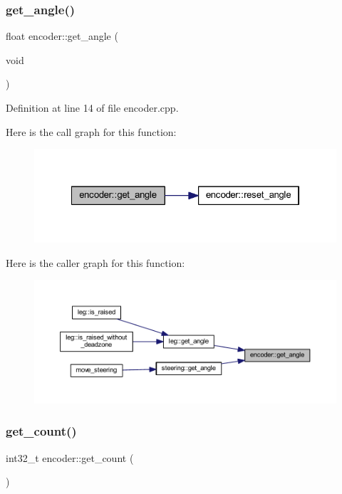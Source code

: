 \subsubsection{\texorpdfstring{get\_angle()}{get\_angle()}}
{\footnotesize\ttfamily float encoder\+::get\+\_\+angle (\begin{DoxyParamCaption}\item[{void}]{ }\end{DoxyParamCaption})}



Definition at line 14 of file encoder.\+cpp.

Here is the call graph for this function\+:
\nopagebreak
\begin{figure}[H]
\begin{center}
\leavevmode
\includegraphics[width=322pt]{classencoder_aba5b6ccdb374d7fcc5d9f2abab1a59da_cgraph}
\end{center}
\end{figure}
Here is the caller graph for this function\+:
\nopagebreak
\begin{figure}[H]
\begin{center}
\leavevmode
\includegraphics[width=350pt]{classencoder_aba5b6ccdb374d7fcc5d9f2abab1a59da_icgraph}
\end{center}
\end{figure}
\mbox{\label{classencoder_a78c1ba3f2bd3abb6714a38b21a2f48e1}} 
\subsubsection{\texorpdfstring{get\_count()}{get\_count()}}
{\footnotesize\ttfamily int32\+\_\+t encoder\+::get\+\_\+count (\begin{DoxyParamCaption}{ }\end{DoxyParamCaption})}



